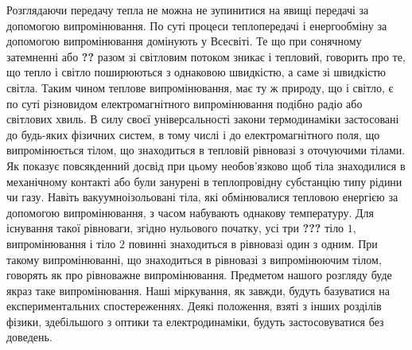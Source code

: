 \documentclass{article}
\begin{document}
\Task{}Розглядаючи передачу тепла не можна не зупинитися на явищі передачі за допомогою випромінювання. По суті процеси теплопередачі і енергообміну 
за допомогою випромінювання домінують у Всесвіті. Те що при сонячному затемненні або \textbf{??} разом зі світловим потоком зникає і тепловий, говорить 
про те, що тепло і світло поширюються з однаковою швидкістю, а саме зі швидкістю світла. Таким чином теплове випромінювання, має ту ж природу, що і світло, 
є по суті різновидом електромагнітного випромінювання подібно радіо або світлових хвиль. В силу своєї універсальності закони термодинаміки застосовані до 
будь-яких фізичних систем, в тому числі і до електромагнітного поля, що випромінюється тілом, що знаходиться в тепловій рівновазі з оточуючими тілами. Як 
показує повсякденний досвід при цьому необов'язково щоб тіла знаходилися в механічному контакті або були занурені в теплопровідну субстанцію типу рідини чи 
газу. Навіть вакуумноізольовані тіла, які обмінювалися тепловою енергією за допомогою випромінювання, з часом набувають однакову температуру. Для існування 
такої рівноваги, згідно нульового початку, усі три \textbf{???} тіло $1$, випромінювання і тіло $2$ повинні знаходиться в рівновазі один з одним. При такому 
випромінюванні, що знаходиться в рівновазі з випромінюючим тілом, говорять як про рівноважне випромінювання. Предметом нашого розгляду буде якраз таке 
випромінювання. Наші міркування, як завжди, будуть базуватися на експериментальних спостереженнях. Деякі положення, взяті з інших розділів фізики, 
здебільшого з оптики та електродинаміки, будуть застосовуватися без доведень. 
\end{document}
